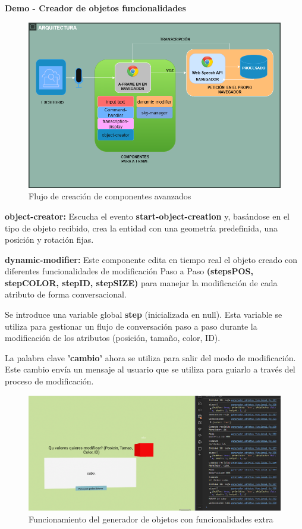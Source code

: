 \documentclass[a4paper, 12pt]{book}
\begin{document}
\textbf{Demo - Creador de objetos funcionalidades }
\begin{figure}[H]  %
  \centering
  \includegraphics[width=0.6\linewidth]{img/componentes3.png}  %
  \caption{Flujo de creación de componentes avanzados}  %
  \label{fig:componente3}  %
\end{figure} 

\textbf{object-creator:} Escucha el evento \textbf{start-object-creation} y, basándose en el tipo de objeto recibido, crea la entidad con una geometría predefinida, una posición y rotación fijas.

\textbf{dynamic-modifier:} Este componente edita en tiempo real el objeto creado con diferentes funcionalidades de modificación Paso a Paso \textbf{(stepsPOS, stepCOLOR, stepID, stepSIZE)} para manejar la modificación de cada atributo de forma conversacional.

Se introduce una variable global \textbf{step} (inicializada en null). Esta variable se utiliza para gestionar un flujo de conversación paso a paso durante la modificación de los atributos (posición, tamaño, color, ID).


La palabra clave \textbf{'cambio'} ahora se utiliza para salir del modo de modificación.
Este cambio envía un mensaje al usuario que se utiliza para guiarlo a través del proceso de modificación.
\begin{figure}[H]  %
  \centering
  \includegraphics[width=0.6\linewidth]{img/generador_funcional_v1.png}  %
  \caption{Funcionamiento del generador de objetos con funcionalidades extra}  %
  \label{fig:generadorFuncionalDemo1}  %
\end{figure} 
\end{document}
